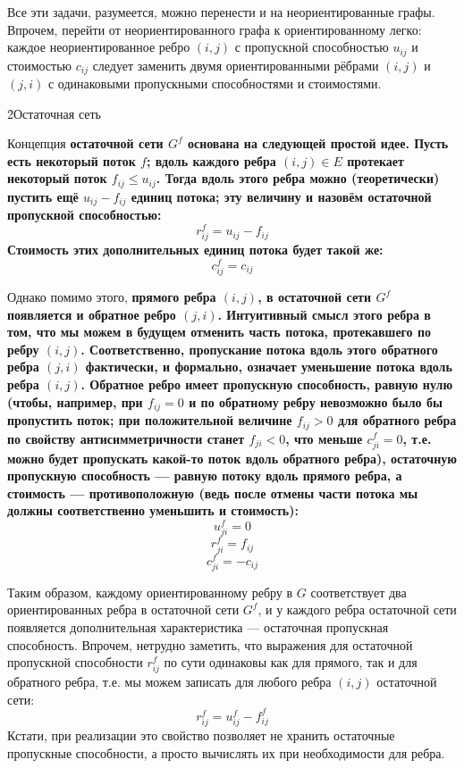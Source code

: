 Все эти задачи, разумеется, можно перенести и на неориентированные графы. Впрочем, перейти от неориентированного графа к ориентированному легко: каждое неориентированное ребро $(i,j)$ с пропускной способностью $u_{ij}$ и стоимостью $c_{ij}$ следует заменить двумя ориентированными рёбрами $(i,j)$ и $(j,i)$ с одинаковыми пропускными способностями и стоимостями.

\h2{Остаточная сеть}

Концепция \bf{остаточной сети} $G^f$ основана на следующей простой идее. Пусть есть некоторый поток $f$; вдоль каждого ребра $(i,j) \in E$ протекает некоторый поток $f_{ij} \le u_{ij}$. Тогда вдоль этого ребра можно (теоретически) пустить ещё $u_{ij} - f_{ij}$ единиц потока; эту величину и назовём \bf{остаточной пропускной способностью}:
$$ r_{ij}^f = u_{ij} - f_{ij} $$
Стоимость этих дополнительных единиц потока будет такой же:
$$ c_{ij}^f = c_{ij} $$

Однако помимо этого, \bf{прямого} ребра $(i,j)$, в остаточной сети $G^f$ появляется и \bf{обратное ребро} $(j,i)$. Интуитивный смысл этого ребра в том, что мы можем в будущем отменить часть потока, протекавшего по ребру $(i,j)$. Соответственно, пропускание потока вдоль этого обратного ребра $(j,i)$ фактически, и формально, означает уменьшение потока вдоль ребра $(i,j)$. Обратное ребро имеет пропускную способность, равную нулю (чтобы, например, при $f_{ij}=0$ и по обратному ребру невозможно было бы пропустить поток; при положительной величине $f_{ij}>0$ для обратного ребра по свойству антисимметричности станет $f_{ji}<0$, что меньше $c_{ji}^f = 0$, т.е. можно будет пропускать какой-то поток вдоль обратного ребра), остаточную пропускную способность --- равную потоку вдоль прямого ребра, а стоимость --- противоположную (ведь после отмены части потока мы должны соответственно уменьшить и стоимость):
$$ u_{ji}^f = 0 $$
$$ r_{ji}^f = f_{ij} $$
$$ c_{ji}^f = -c_{ij} $$

Таким образом, каждому ориентированному ребру в $G$ соответствует два ориентированных ребра в остаточной сети $G^f$, и у каждого ребра остаточной сети появляется дополнительная характеристика --- остаточная пропускная способность. Впрочем, нетрудно заметить, что выражения для остаточной пропускной способности $r_{ij}^f$ по сути одинаковы как для прямого, так и для обратного ребра, т.е. мы можем записать для любого ребра $(i,j)$ остаточной сети:
$$ r_{ij}^f = u_{ij}^f - f_{ij}^f $$
Кстати, при реализации это свойство позволяет не хранить остаточные пропускные способности, а просто вычислять их при необходимости для ребра.

